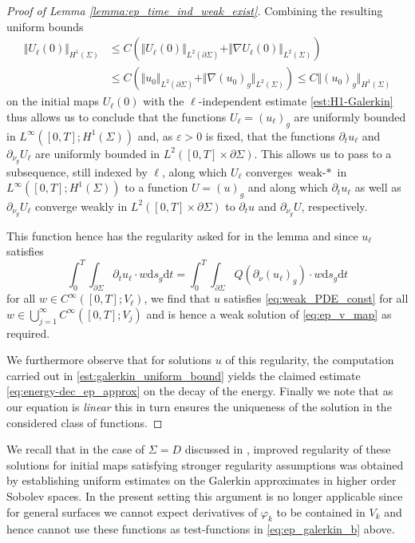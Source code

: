 \documentclass[10pt,reqno]{amsart}
\theoremstyle{plain}
\theoremstyle{definition}
\numberwithin{equation}{section}
\newcommand{\Si}{\Sigma}
\newcommand{\norm}[1]{\Vert#1\Vert}
\newcommand{\beqas}{\begin{equation*}\begin{aligned}}
\newcommand{\eeqas}{\end{aligned}\end{equation*}}
\newcommand{\dd}{\mathrm{d}} %
\newcommand{\eps}{\varepsilon}
\newcommand{\na}{\nabla}
\newcommand{\pSi}{{\partial \Sigma}}
\newcommand{\p}{\partial} %
\begin{document}
\begin{proof}[Proof of Lemma \ref{lemma:ep_time_ind_weak_exist}]
    Combining the resulting uniform bounds 
    \beqas
        \norm{U_\ell(0)}_{H^1(\Si)}&\leq C(\norm{U_\ell(0)}_{L^2(\pSi)}+\norm{\na U_\ell(0)}_{L^2(\Si)})\\
        &\leq C(\norm{u_0}_{L^2(\pSi)}+\norm{\na (u_0)_g}_{L^2(\Si)})\leq C\norm{(u_0)_g}_{H^1(\Si)}
    \eeqas
    on the initial maps $U_\ell(0)$ with the $\ell$-independent estimate \eqref{est:H1-Galerkin} thus allows us to conclude that the functions $U_\ell=(u_\ell)_g$ are uniformly bounded in $L^\infty([0,T];H^1(\Si))$ and, as $\eps>0$ is fixed, that the functions $\p_t u_\ell$ and $\p_{\nu_g}U_\ell$ are uniformly bounded in $L^2([0,T]\times\p\Si)$. This allows us to pass to a subsequence, still indexed by $\ell$, along which $U_\ell$ converges $\text{weak-}*$ in $L^\infty([0,T];H^1(\Si))$ to a function $U=(u)_g$ and along which $\p_t u_\ell$ as well as $\p_{\nu_g}U_\ell$ converge weakly in $L^2([0,T]\times\p\Si)$ to $\p_t u$ and $\p_{\nu_g}U$, respectively.

    This function hence has the regularity asked for in the lemma and since $u_\ell$ satisfies 
    \begin{equation}\label{eq:weak_PDE_const}
        \int_0^T \int_{\p\Si}\p_t u_\ell \cdot w \dd s_g \dd t = \int_0^T \int_{\p\Si} Q(\p_\nu (u_\ell)_g) \cdot w\dd s_g \dd t
    \end{equation}
    for all $w \in C^{\infty}([0,T];V_\ell)$, we find that $u$ satisfies \eqref{eq:weak_PDE_const} for all $w \in \bigcup_{j=1}^\infty C^{\infty}([0,T];V_j)$ and is hence a weak solution of \eqref{eq:ep_v_map} as required. 

    
    We furthermore observe that for solutions $u$ of this regularity, the computation carried out in \eqref{est:galerkin_uniform_bound} yields the claimed estimate \eqref{eq:energy-dec_ep_approx} on the decay of the energy. Finally we note that as our equation is \textit{linear} this in turn ensures the uniqueness of the solution in the considered class of functions.
\end{proof}


We recall that in the case of $\Si = D$ discussed in \cite{S}, improved regularity of these solutions for initial maps satisfying stronger regularity assumptions was obtained by establishing uniform estimates on the Galerkin approximates in higher order Sobolev spaces. In the present setting this argument is no longer applicable since for general surfaces we cannot expect derivatives of $\varphi_k$ to be contained in $V_k$ and hence cannot use these functions as test-functions in \eqref{eq:ep_galerkin_b} above.
\end{document}
